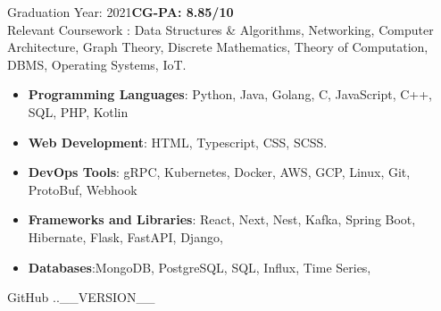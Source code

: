 \documentclass[10pt,a4paper,ragged2e]{classes/altacv}
\begin{document}


Graduation Year: 2021\hspace{5mm}\textbf{CG-PA: 8.85/10 }\\
\smallskip
Relevant Coursework : Data Structures \& Algorithms, Networking, Computer Architecture, Graph Theory, Discrete Mathematics, Theory of Computation, DBMS, Operating Systems, IoT.



\smallskip
\begin{itemize}
\item \textbf{Programming Languages}: Python, Java, Golang, C, JavaScript, C++, SQL, PHP, Kotlin
\smallskip
\item \textbf{Web Development}: HTML, Typescript, CSS, SCSS.
\smallskip
\item \textbf{DevOps Tools}: gRPC, Kubernetes, Docker, AWS, GCP, Linux, Git, ProtoBuf, Webhook
\smallskip
\item \textbf{Frameworks and Libraries}: React, Next, Nest, Kafka, Spring Boot, Hibernate, Flask, FastAPI, Django, 
\smallskip
\item \textbf{Databases}:MongoDB, PostgreSQL, SQL, Influx, Time Series,  
\smallskip
\end{itemize}

\smallskip
\begin{footnotesize}
GitHub \number \month .\number\year.__VERSION__
\end{footnotesize}
\clearpage
\end{document}
